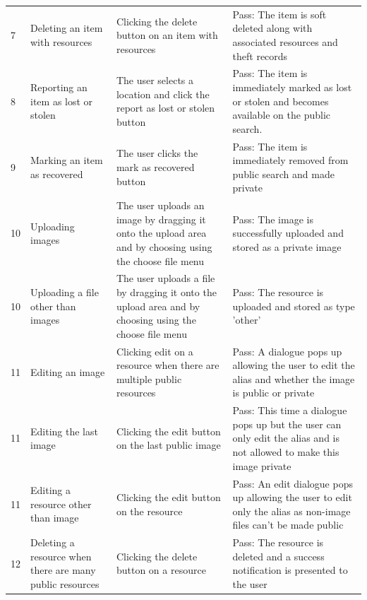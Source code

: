 \begin{longtable}{@{}p{}p{}p{}p{}@{}}
	7 & Deleting an item with resources & Clicking the delete button on an item with resources & \textcolor{PassGreen}{Pass}: The item is soft deleted along with associated resources and theft records \\
	
	8 & Reporting an item as lost or stolen & The user selects a location and click the report as lost or stolen button & \textcolor{PassGreen}{Pass}: The item is immediately marked as lost or stolen and becomes available on the public search. \\
	
	9 & Marking an item as recovered & The user clicks the mark as recovered button & \textcolor{PassGreen}{Pass}: The item is immediately removed from public search and made private \\
	
	10 & Uploading images & The user uploads an image by dragging it onto the upload area and by choosing using the choose file menu & \textcolor{PassGreen}{Pass}: The image is successfully uploaded and stored as a private image \\
		
	10 & Uploading a file other than images & The user uploads a file by dragging it onto the upload area and by choosing using the choose file menu & \textcolor{PassGreen}{Pass}: The resource is uploaded and stored as type 'other' \\
	
	11 & Editing an image & Clicking edit on a resource when there are multiple public resources & \textcolor{PassGreen}{Pass}: A dialogue pops up allowing the user to edit the alias and whether the image is public or private \\
	
	11 & Editing the last image & Clicking the edit button on the last public image & \textcolor{PassGreen}{Pass}: This time a dialogue pops up but the user can only edit the alias and is not allowed to make this image private \\
	
	
	11 & Editing a resource other than image & Clicking the edit button on the resource & \textcolor{PassGreen}{Pass}: An edit dialogue pops up allowing the user to edit only the alias as non-image files can't be made public \\
	
	12 & Deleting a resource when there are many public resources & Clicking the delete button on a resource & \textcolor{PassGreen}{Pass}: The resource is deleted and a success notification is presented to the user \\
	

\end{longtable}
